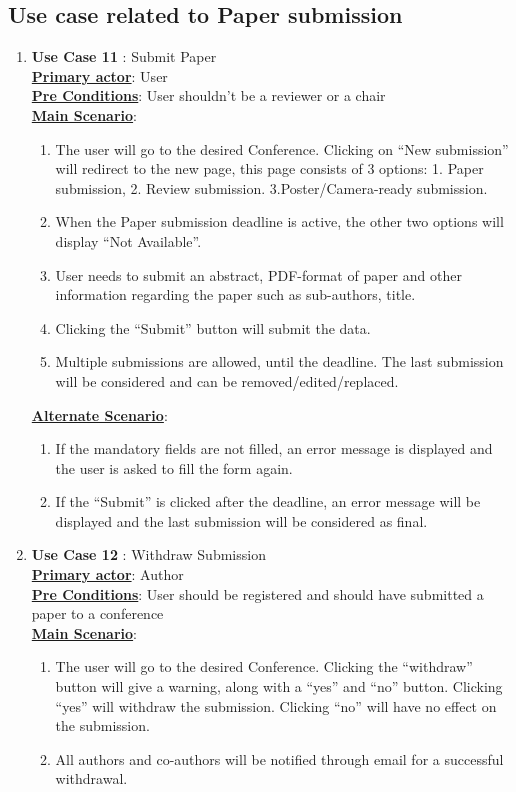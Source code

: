 \documentclass[english,a4paper,12pt]{report}
\begin{document}
\subsection{Use case related to Paper submission}
\begin{enumerate}
    \item \textbf{Use Case 11 }: Submit Paper \\
\underline{\textbf{Primary actor}}: User\\
\underline{\textbf{Pre Conditions}}: User shouldn't be a reviewer or a chair\\
\underline{\textbf{Main Scenario}}:
\begin{enumerate}
    \item The user will go to the desired Conference. Clicking on “New submission”
will redirect to the new page, this page consists
of 3 options: 1. Paper submission, 2. Review submission. 3.Poster/Camera-ready submission. 
\item When the Paper submission deadline is active, the other two options will display “Not Available”.
\item User needs to submit an abstract, PDF-format of paper and other information regarding the paper such as sub-authors, title.
\item Clicking the “Submit” button will submit the data.
\item Multiple submissions are allowed, until the
deadline. The last submission will be considered and can be removed/edited/replaced.
\end{enumerate}
\underline{\textbf{Alternate Scenario}}:
\begin{enumerate}
    \item If the mandatory fields are not filled, an error message is displayed and the user is asked to fill the form again.
\item If the “Submit” is clicked after the deadline, an error message will be displayed and the last submission will be considered as final.
\end{enumerate}

\item \textbf{Use Case 12 }: Withdraw Submission \\
\underline{\textbf{Primary actor}}: Author\\
\underline{\textbf{Pre Conditions}}: User should be registered and should have submitted a paper to a conference\\
\underline{\textbf{Main Scenario}}:
\begin{enumerate}
    \item The user will go to the desired Conference. Clicking the “withdraw” button will give a warning, along with a “yes” and “no” button. Clicking “yes” will withdraw the submission. Clicking “no” will have no effect on the submission.
\item All authors and co-authors will be notified through email for a successful withdrawal.
\end{enumerate}



\end{enumerate}
\end{document}
